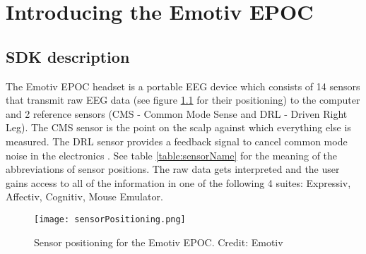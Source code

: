 \chapter{Introducing the Emotiv EPOC}
\label{cha:epoc}

\section{SDK description}
The Emotiv EPOC headset is a portable EEG device which consists of 14 sensors that transmit raw EEG data (see figure \ref{fig:sensorPos} for their positioning) to the computer and 2 reference sensors (CMS - Common Mode Sense and DRL - Driven Right Leg). The CMS sensor is the point on the scalp against which everything else is measured. The DRL sensor provides a feedback signal to cancel common mode noise in the electronics \cite{refSensors1, refSensors2}. See table \ref{table:sensorName} for the meaning of the abbreviations of sensor positions. The raw data gets interpreted and the user gains access to all of the information in one of the following 4 suites: Expressiv, Affectiv, Cognitiv, Mouse Emulator. 

\begin{figure}
  \centering
  \texttt{[image: sensorPositioning.png]}
  \caption{Sensor positioning for the Emotiv EPOC. Credit: Emotiv}
    \label{fig:sensorPos}           
\end{figure}


